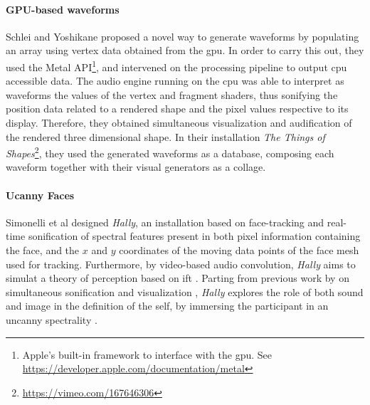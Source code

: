 \paragraph{GPU-based waveforms}
Schlei and Yoshikane \parencite{icmc/bbp2372.2016.056} proposed a novel way to generate waveforms by populating an array using vertex data obtained from the \gls{gpu}. In order to carry this out, they used the Metal API\footnote{Apple's built-in framework to interface with the \gls{gpu}. See \url{https://developer.apple.com/documentation/metal}}, and intervened on the processing pipeline to output \gls{cpu} accessible data. The audio engine running on the \gls{cpu} was able to interpret as waveforms the values of the vertex and fragment shaders, thus sonifying the position data related to a rendered shape and the pixel values respective to its display. Therefore, they obtained simultaneous visualization and audification of the rendered three dimensional shape. In their installation \textit{The Things of Shapes}\footnote{\url{https://vimeo.com/167646306}}, they used the generated waveforms as a database, composing each waveform together with their visual generators as a collage.

\paragraph{Ucanny Faces}
Simonelli et al \parencite{fdch/installation/spectral} designed \textit{Hally}, an installation based on face-tracking and real-time sonification of spectral features present in both pixel information containing the face, and the $x$ and $y$ coordinates of the moving data points of the face mesh used for tracking. Furthermore, by video-based audio convolution, \textit{Hally} aims to simulat a theory of perception based on \gls{ift} \parencite{connes:shapes}. Parting from previous work by \citeauthor{Sch07:How} on simultaneous sonification and visualization \parencite{Sch07:How}, \textit{Hally} explores the role of both sound and image in the definition of the self, by immersing the participant in an uncanny spectrality \parencite{fdch/papers/spectral}.


% 
% 



